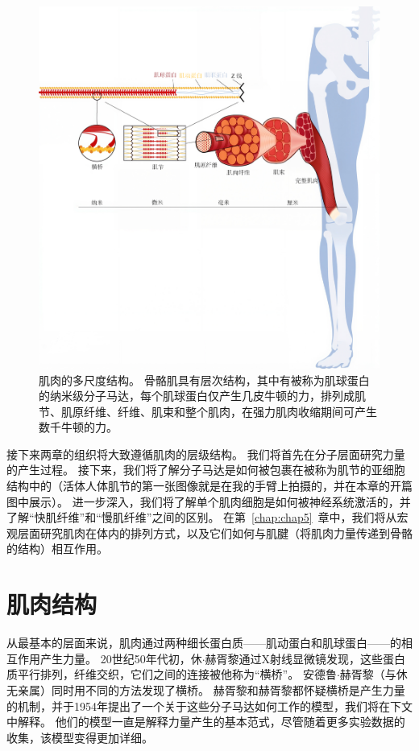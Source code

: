 \begin{figure}[!htb]
	\centering
	\includegraphics[width=1.0\linewidth]{chap4/4_2}
	\caption{肌肉的多尺度结构。
		骨骼肌具有层次结构，其中有被称为肌球蛋白的纳米级分子马达，每个肌球蛋白仅产生几皮牛顿的力，排列成肌节、肌原纤维、纤维、肌束和整个肌肉，在强力肌肉收缩期间可产生数千牛顿的力。 \label{fig:4_2}}
\end{figure}


接下来两章的组织将大致遵循肌肉的层级结构。
我们将首先在分子层面研究力量的产生过程。
接下来，我们将了解分子马达是如何被包裹在被称为肌节的亚细胞结构中的（活体人体肌节的第一张图像就是在我的手臂上拍摄的，并在本章的开篇图中展示）。
进一步深入，我们将了解单个肌肉细胞是如何被神经系统激活的，并了解“快肌纤维”和“慢肌纤维”之间的区别。
在第~\ref{chap:chap5}~章中，我们将从宏观层面研究肌肉在体内的排列方式，以及它们如何与肌腱（将肌肉力量传递到骨骼的结构）相互作用。


\section{肌肉结构}

从最基本的层面来说，肌肉通过两种细长蛋白质——肌动蛋白和肌球蛋白——的相互作用产生力量。
20世纪50年代初，休$\cdot$赫胥黎通过X射线显微镜发现，这些蛋白质平行排列，纤维交织，它们之间的连接被他称为“横桥”。
安德鲁$\cdot$赫胥黎（与休无亲属）同时用不同的方法发现了横桥。
赫胥黎和赫胥黎都怀疑横桥是产生力量的机制，并于1954年提出了一个关于这些分子马达如何工作的模型，我们将在下文中解释。
他们的模型一直是解释力量产生的基本范式，尽管随着更多实验数据的收集，该模型变得更加详细。


